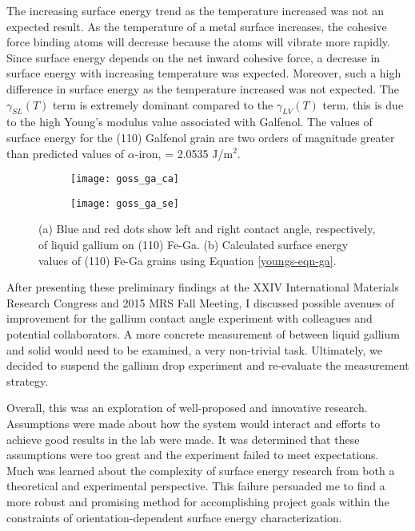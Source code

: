 The increasing surface energy trend as the temperature increased was not an expected result. As the temperature of a metal surface increases, the cohesive force binding atoms will decrease because the atoms will vibrate more rapidly. Since surface energy depends on the net inward cohesive force, a decrease in surface energy with increasing temperature was expected. Moreover, such a high difference in surface energy as the temperature increased was not expected. The $ \gamma_{SL}(T) $ term is extremely dominant compared to the $ \gamma_{LV}(T) $ term. this is due to the high Young's modulus value associated with Galfenol. The values of surface energy for the \hkl(110) Galfenol grain are two orders of magnitude greater than predicted values of $\alpha$-iron, \gamSV = 2.0535 J/m$^2$.\cite{Wang2000} 
\begin{figure}[h]
	\centering
	\begin{subfigure}[c]{0.47\textwidth}
		\texttt{[image: goss\_ga\_ca]}
		\subcaption{~}
		\label{fig:goss_ga_ca}		
	\end{subfigure}
	\begin{subfigure}[c]{0.47\textwidth} 
		\texttt{[image: goss\_ga\_se]}
		\subcaption{~}
		\label{fig:goss_ga_se}		
	\end{subfigure}
	\caption{(a) Blue and red dots show left and right contact angle, respectively, of liquid gallium on \hkl(110) Fe-Ga. (b) Calculated surface energy values of \hkl(110) Fe-Ga grains using Equation \ref{youngs-eqn-ga}.}
	\label{fig:goss_se_msrmnt}
\end{figure}
 After presenting these preliminary findings at the XXIV International Materials Research Congress and 2015 MRS Fall Meeting,\cite{VanOrder2015a,VanOrder2015} I discussed possible avenues of improvement for the gallium contact angle experiment with colleagues and potential collaborators. A more concrete measurement of \gamSL between liquid gallium and solid would need to be examined, a very non-trivial task. Ultimately, we decided to suspend the gallium drop experiment and re-evaluate the measurement strategy. 
 
Overall, this was an exploration of well-proposed and innovative research. Assumptions were made about how the system would interact and efforts to achieve good results in the lab were made. It was determined that these assumptions were too great and the experiment failed to meet expectations. Much was learned about the complexity of surface energy research from both a theoretical and experimental perspective. This failure persuaded me to find a more robust and promising method for accomplishing project goals within the constraints of orientation-dependent surface energy characterization. 



